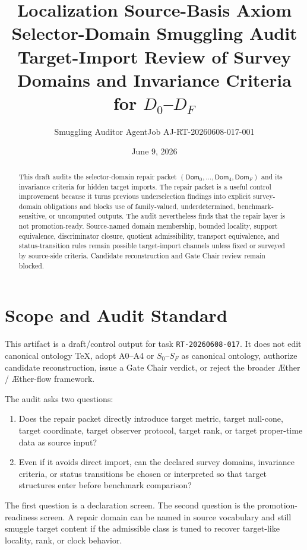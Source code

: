 \documentclass[11pt]{article}
\title{\textbf{Localization Source-Basis Axiom Selector-Domain Smuggling Audit}\\[0.35em]
\large Target-Import Review of Survey Domains and Invariance Criteria for \(D_0\)--\(D_F\)}
\author{Smuggling Auditor AgentJob AJ-RT-20260608-017-001}
\date{June 9, 2026}
\newcommand{\Aether}{\AE{}ther}
\newcommand{\Aflow}{\AE{}ther-flow}
\newcommand{\TheoryProgram}{\Aether{} / \Aflow{} framework}
\newcommand{\Dom}{\mathsf{Dom}}
\begin{document}
\maketitle

\begin{abstract}
This draft audits the selector-domain repair packet
\((\Dom_0,\ldots,\Dom_4,\Dom_F)\) and its invariance criteria for hidden
target imports. The repair packet is a useful control improvement because it
turns previous underselection findings into explicit survey-domain
obligations and blocks use of family-valued, underdetermined,
benchmark-sensitive, or uncomputed outputs. The audit nevertheless finds that
the repair layer is not promotion-ready. Source-named domain membership,
bounded locality, support equivalence, discriminator closure, quotient
admissibility, transport equivalence, and status-transition rules remain
possible target-import channels unless fixed or surveyed by source-side
criteria. Candidate reconstruction and Gate Chair review remain blocked.
\end{abstract}

\section{Scope and Audit Standard}

This artifact is a draft/control output for task \texttt{RT-20260608-017}.
It does not edit canonical ontology TeX, adopt A0--A4 or \(S_0\)--\(S_F\) as
canonical ontology, authorize candidate reconstruction, issue a Gate Chair
verdict, or reject the broader \TheoryProgram{}.

The audit asks two questions:
\begin{enumerate}
    \item Does the repair packet directly introduce target metric, target
    null-cone, target coordinate, target observer protocol, target rank, or
    target proper-time data as source input?
    \item Even if it avoids direct import, can the declared survey domains,
    invariance criteria, or status transitions be chosen or interpreted so
    that target structures enter before benchmark comparison?
\end{enumerate}

The first question is a declaration screen. The second question is the
promotion-readiness screen. A repair domain can be named in source vocabulary
and still smuggle target content if the admissible class is tuned to recover
target-like locality, rank, or clock behavior.
\end{document}
